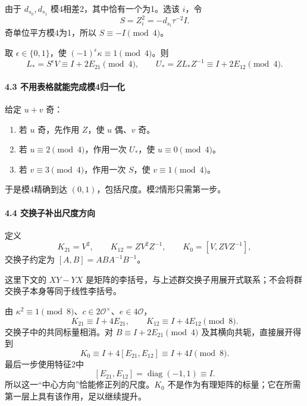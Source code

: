 \documentclass[11pt,a4paper]{article}
\newcommand{\tightlist}{\setlength{\itemsep}{0pt}\setlength{\parskip}{0pt}}
\theoremstyle{definition}
\numberwithin{equation}{section}
\begin{document}
{由于} \(d_{s_0},d_{s_1}\) {模4相差2，其中恰有一个为1。选该} \(i\){，令} \[
S=Z_i^2=-d_{s_i}\tau^{-2}I.
\] {奇单位平方模4为1，所以} \(S\equiv-I\pmod4\){。}

{取} \(\epsilon\in\{0,1\}\){，使} \((-1)^\epsilon\kappa\equiv1\pmod4\){。则} \[
L_*=S^\epsilon V\equiv I+2E_{21}\pmod4,\qquad
U_*=ZL_*Z^{-1}\equiv I+2E_{12}\pmod4.
\tag{C15.4.2}
\]

\paragraph*{\texorpdfstring{{4.3} {不用表格就能完成模4归一化}}{4.3 不用表格就能完成模4归一化}}\label{C15-h110}

{给定} \(u+v\) {奇：}

\begin{enumerate}
\def\labelenumi{\arabic{enumi}.}
\tightlist
\item
  {若} \(u\) {奇，先作用} \(Z\){，使} \(u\) {偶、}\(v\) {奇。}
\item
  {若} \(u\equiv2\pmod4\){，作用一次} \(U_*\){，使} \(u\equiv0\pmod4\){。}
\item
  {若} \(v\equiv3\pmod4\){，作用一次} \(S\){，使} \(v\equiv1\pmod4\){。}
\end{enumerate}

{于是模4精确到达} \((0,1)\){，包括尺度。模2情形只需第一步。}

\paragraph*{\texorpdfstring{{4.4} {交换子补出尺度方向}}{4.4 交换子补出尺度方向}}\label{C15-h111}

{定义} \[
K_{21}=V^2,\qquad K_{12}=ZV^2Z^{-1},\qquad
K_0=[V,ZVZ^{-1}],
\] {交换子约定为} \([A,B]=ABA^{-1}B^{-1}\){。}

{这里下文的} \(XY-YX\) {是矩阵的李括号，与上述群交换子用展开式联系；不会将群交换子本身等同于线性李括号。}

{由} \(\kappa^2\equiv1\pmod8\){、}\(c\in2\mathcal O^\times\){、}\(e\in4\mathcal O\){，} \[
K_{21}\equiv I+4E_{21},\qquad
K_{12}\equiv I+4E_{12}\pmod8.
\tag{C15.4.3}
\] {交换子中的共同标量相消。对} \(B\equiv I+2E_{21}\pmod4\) {及其横向共轭，直接展开得到} \[
K_0\equiv I+4[E_{21},E_{12}]
       \equiv I+4I\pmod8.
\tag{C15.4.4}
\] {最后一步使用特征2中} \[
[E_{21},E_{12}]=\operatorname{diag}(-1,1)\equiv I.
\] {所以这一``中心方向''恰能修正列的尺度。}\(K_0\) {不是作为有理矩阵的标量；它在所需第一层上具有该作用，足以继续提升。}
\end{document}
